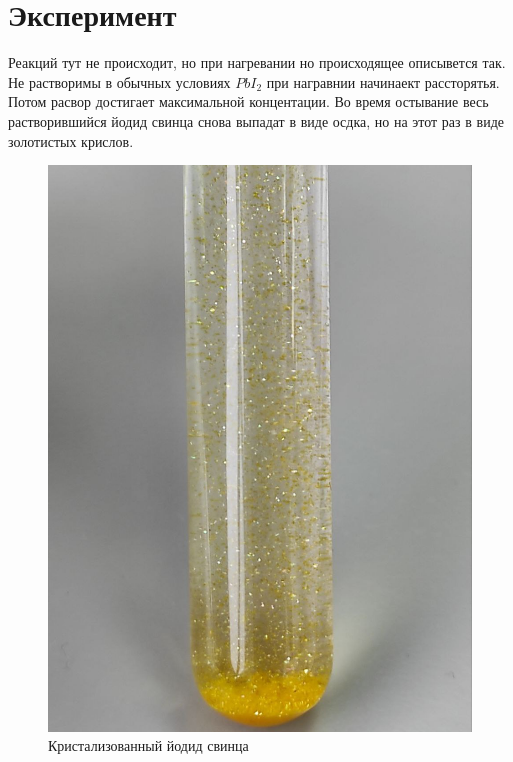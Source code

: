\section{Эксперимент}

\tab Реакций тут не происходит, но при нагревании но происходящее 
описывется так. Не растворимы в обычных условиях $PbI_2$ при 
награвнии начинаект рассторятья. Потом расвор достигает 
максимальной концентации. Во время остывание весь растворившийся 
йодид свинца снова выпадат в виде осдка, но на этот раз в виде 
золотистых крислов.

\begin{figure}[h]
    \centering
    \includegraphics[width=0.6\linewidth]{Ex_7/crist.jpg}
     \caption{Кристализованный йодид свинца}
    \label{ex_7_1}
\end{figure}



